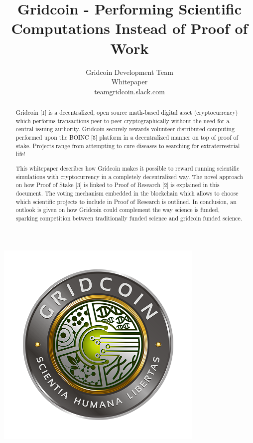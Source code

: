 \documentclass[10pt,a4paper]{article}
\begin{document}
\pagestyle{headings}




\title{Gridcoin - Performing Scientific Computations Instead of Proof of Work}

\author{Gridcoin Development Team\\
Whitepaper\\
teamgridcoin.slack.com\\}




\maketitle
\thispagestyle{empty}

\begin{abstract}
Gridcoin [1] is a decentralized, open source math-based digital asset (cryptocurrency) which performs transactions peer-to-peer cryptographically without the need for a central issuing authority.
Gridcoin securely rewards volunteer distributed computing performed upon the BOINC [5] platform in a decentralized manner on top of proof of stake. Projects range from attempting to cure diseases to searching for extraterrestrial life! 

This whitepaper describes how Gridcoin makes it possible to reward running scientific simulations with cryptocurrency in a completely decentralized way. The novel approach on how Proof of Stake [3] is linked to Proof of Research [2] is explained in this document. The voting mechanism embedded in the blockchain which allows to choose which scientific projects to include in Proof of Research is outlined. In conclusion, an outlook is given on how Gridcoin could complement the way science is funded, sparking competition between traditionally funded science and gridcoin funded science.
\end{abstract}

\begin{center}
\includegraphics{gridcoin-art-small}
\end{center}
\end{document}
